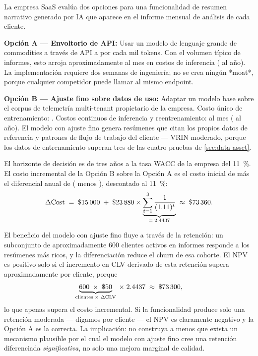 \begin{example}
La empresa SaaS evalúa dos opciones para una funcionalidad de resumen narrativo generado por IA
que aparece en el informe mensual de análisis de cada cliente.

\textbf{Opción A — Envoltorio de API:} Usar un modelo de lenguaje grande de commodities a través
de API a  por cada mil tokens. Con el volumen típico de informes, esto arroja
aproximadamente  al mes en costos de inferencia ( al año). La implementación
requiere dos semanas de ingeniería; no se crea ningún *moat*, porque cualquier competidor puede
llamar al mismo endpoint.

\textbf{Opción B — Ajuste fino sobre datos de uso:} Adaptar un modelo base sobre el corpus de
telemetría multi-tenant propietario de la empresa. Costo único de entrenamiento: .
Costos continuos de inferencia y reentrenamiento:  al mes ( al año).
El modelo con ajuste fino genera resúmenes que citan los propios datos de referencia y patrones de
flujo de trabajo del cliente — VRIN moderado, porque los datos de entrenamiento superan tres de
las cuatro pruebas de \cref{sec:data-asset}.

El horizonte de decisión es de tres años a la tasa WACC de la empresa del \qty{11}{\percent}. El
costo incremental de la Opción B sobre la Opción A es el costo inicial de  más el
diferencial anual de  ( menos ), descontado al \qty{11}{\percent}:
\[
  \Delta\mathrm{Cost} \;=\; \$\num{15000}
    \;+\; \$\num{23880}\times
    \underbrace{\sum_{t=1}^{3}\frac{1}{(1.11)^{t}}}_{=\;2.4437}
  \;\approx\; \$\num{73360}.
\]

El beneficio del modelo con ajuste fino fluye a través de la retención: un subconjunto de
aproximadamente 600 clientes activos en informes responde a los resúmenes más ricos, y la
diferenciación reduce el churn de esa cohorte. El NPV es positivo solo si el incremento en CLV
derivado de esta retención supera aproximadamente  por cliente, porque
\[
  \underbrace{600\;\times\;\$\num{50}}_{\text{clientes}\;\times\;\Delta\mathrm{CLV}}
  \;\times\; 2.4437
  \;\approx\; \$\num{73300},
\]
lo que apenas supera el costo incremental. Si la funcionalidad produce solo una retención moderada
— digamos  por cliente — el NPV es claramente negativo y la Opción A es la correcta.
La implicación: no construya a menos que exista un mecanismo plausible por el cual el modelo con
ajuste fino cree una retención diferenciada \emph{significativa}, no solo una mejora marginal
de calidad.
\end{example}

